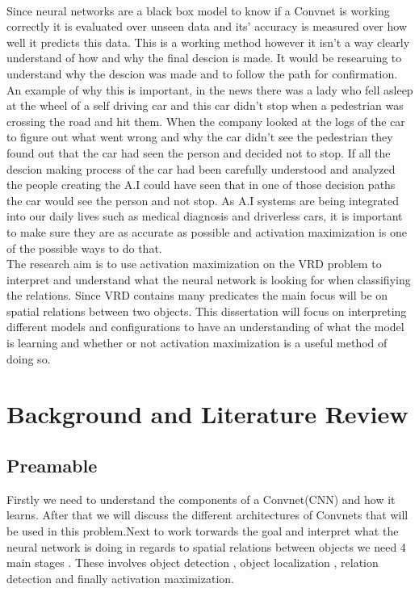 \documentclass{csfyp}
\newcommand\tab[1][1cm]{\hspace*{#1}}
\begin{document}
\\
\tab
Since neural networks are a black box model to know if a Convnet is working correctly it is evaluated over unseen data and its’ accuracy is measured over how well it predicts this data. This is a working method however it isn’t a way clearly understand of how and why the final descion is made. It would be researuing to understand why the descion was made and to follow the path for confirmation. An example of why this is important, in the news there was a lady who fell asleep at the wheel of a self driving car and this car didn’t stop when a pedestrian was crossing the road and hit them. When the company looked at the logs of the car to figure out what went wrong and why the car didn’t see the pedestrian they found out that the car had seen the person and decided not to stop. If all the descion making process of the car had been carefully understood and analyzed the people creating the A.I could have seen that in one of those decision paths the car would see the person and not stop. As A.I systems are being integrated into our daily lives such as medical diagnosis and driverless cars, it is important to make sure they are as accurate as possible and activation maximization is one of the possible ways to do that.
\\
\tab
The research aim is to use activation maximization on the VRD problem to interpret and understand what the neural network is looking for when classifiying the relations. Since VRD contains many predicates the main focus will be on spatial relations between two objects. This dissertation will focus on interpreting different models and configurations to have an understanding of what the model is learning  and whether or not activation maximization is a useful method of doing so.

\section{Background and Literature Review}
\subsection{Preamable}
Firstly we need to understand the components of a Convnet(CNN) and how it learns. After that we will discuss the different architectures of Convnets that will be used in this problem.Next to work torwards the goal and interpret what the neural network is doing in regards to spatial relations between objects we need 4 main stages . These involves object detection , object localization , relation detection and finally activation maximization.
\end{document}
